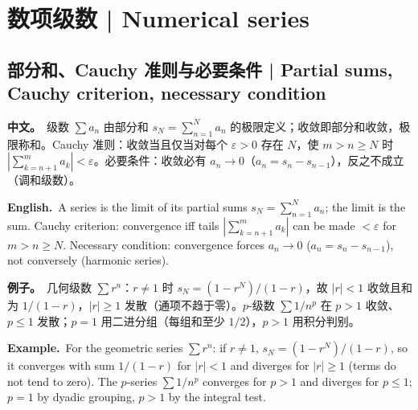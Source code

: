 \documentclass[UTF8,11pt,a4paper]{ctexart}
\newcommand{\BOTH}[2]{\par\noindent\textbf{中文。}\ #1\par\noindent\textbf{English.}\ #2\par}
\newcommand{\EX}[2]{\par\noindent\textbf{例子。}\ #1\par\noindent\textbf{Example.}\ #2\par}
\begin{document}
\section{数项级数 | Numerical series}

\subsection{部分和、Cauchy 准则与必要条件 | Partial sums, Cauchy criterion, necessary condition}
\BOTH{级数 $\sum a_n$ 由部分和 $s_N=\sum_{n=1}^N a_n$ 的极限定义；收敛即部分和收敛，极限称和。Cauchy 准则：收敛当且仅当对每个 $\varepsilon>0$ 存在 $N$，使 $m>n\ge N$ 时 $|\sum_{k=n+1}^m a_k|<\varepsilon$。必要条件：收敛必有 $a_n\to0$（$a_n=s_n-s_{n-1}$），反之不成立（调和级数）。}{A series is the limit of its partial sums $s_N=\sum_{n=1}^N a_n$; the limit is the sum. Cauchy criterion: convergence iff tails $|\sum_{k=n+1}^m a_k|$ can be made $<\varepsilon$ for $m>n\ge N$. Necessary condition: convergence forces $a_n\to0$ ($a_n=s_n-s_{n-1}$), not conversely (harmonic series).}
\EX{几何级数 $\sum r^n$：$r\ne1$ 时 $s_N=(1-r^N)/(1-r)$，故 $|r|<1$ 收敛且和为 $1/(1-r)$，$|r|\ge1$ 发散（通项不趋于零）。$p$-级数 $\sum1/n^p$ 在 $p>1$ 收敛、$p\le1$ 发散；$p=1$ 用二进分组（每组和至少 $1/2$），$p>1$ 用积分判别。}{For the geometric series $\sum r^n$: if $r\ne1$, $s_N=(1-r^N)/(1-r)$, so it converges with sum $1/(1-r)$ for $|r|<1$ and diverges for $|r|\ge1$ (terms do not tend to zero). The $p$-series $\sum1/n^p$ converges for $p>1$ and diverges for $p\le1$; $p=1$ by dyadic grouping, $p>1$ by the integral test.}
\end{document}
